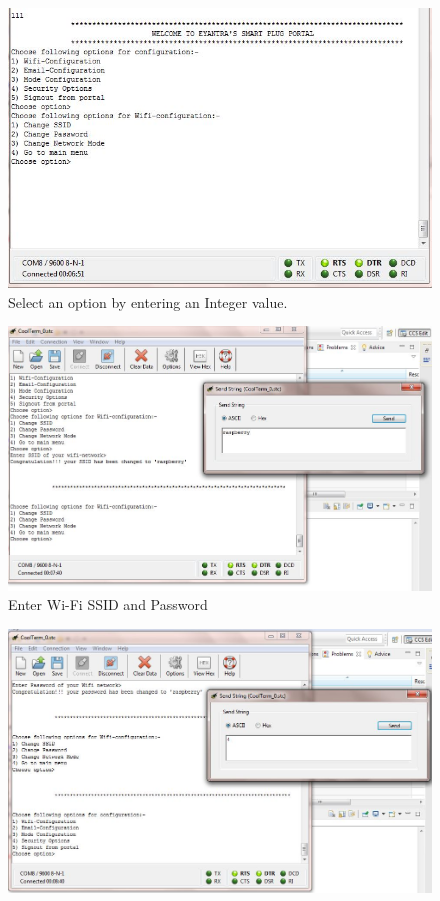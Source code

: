\documentclass[a4paper,12pt,oneside]{book}
\begin{document}
\begin{itemize}
\begin{figure}[H]
		\includegraphics[width=13cm]{coolterm3.jpg}
		\caption{Select an option by entering an Integer value.}
		\label{30}
	\end{figure}
	\begin{figure}[H]  \centering
		\includegraphics[width=13cm]{coolterm4.jpg}
		\caption{Enter Wi-Fi SSID and Password}
		\label{31}
	\end{figure}
	\begin{figure}[H]  \centering
		\includegraphics[width=13cm]{coolterm5.jpg}

\end{figure}
\end{itemize}
\end{document}
